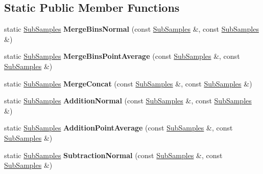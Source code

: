 \subsection*{Static Public Member Functions}
\begin{DoxyCompactItemize}
\item 
\mbox{\label{classQn_1_1SubSamples_a8800a686a91438faf17d5fd3bfb04561}} 
static \mbox{\hyperlink{classQn_1_1SubSamples}{Sub\+Samples}} {\bfseries Merge\+Bins\+Normal} (const \mbox{\hyperlink{classQn_1_1SubSamples}{Sub\+Samples}} \&, const \mbox{\hyperlink{classQn_1_1SubSamples}{Sub\+Samples}} \&)
\item 
\mbox{\label{classQn_1_1SubSamples_a6c499fab1964e330b2531aed834306ec}} 
static \mbox{\hyperlink{classQn_1_1SubSamples}{Sub\+Samples}} {\bfseries Merge\+Bins\+Point\+Average} (const \mbox{\hyperlink{classQn_1_1SubSamples}{Sub\+Samples}} \&, const \mbox{\hyperlink{classQn_1_1SubSamples}{Sub\+Samples}} \&)
\item 
\mbox{\label{classQn_1_1SubSamples_a2df436ba16263977525d033f22ad37d0}} 
static \mbox{\hyperlink{classQn_1_1SubSamples}{Sub\+Samples}} {\bfseries Merge\+Concat} (const \mbox{\hyperlink{classQn_1_1SubSamples}{Sub\+Samples}} \&, const \mbox{\hyperlink{classQn_1_1SubSamples}{Sub\+Samples}} \&)
\item 
\mbox{\label{classQn_1_1SubSamples_aac360780d31b557593844e0f78fdfedd}} 
static \mbox{\hyperlink{classQn_1_1SubSamples}{Sub\+Samples}} {\bfseries Addition\+Normal} (const \mbox{\hyperlink{classQn_1_1SubSamples}{Sub\+Samples}} \&, const \mbox{\hyperlink{classQn_1_1SubSamples}{Sub\+Samples}} \&)
\item 
\mbox{\label{classQn_1_1SubSamples_a99ce4fef8c5db53de7f8e0a06e0fa32f}} 
static \mbox{\hyperlink{classQn_1_1SubSamples}{Sub\+Samples}} {\bfseries Addition\+Point\+Average} (const \mbox{\hyperlink{classQn_1_1SubSamples}{Sub\+Samples}} \&, const \mbox{\hyperlink{classQn_1_1SubSamples}{Sub\+Samples}} \&)
\item 
\mbox{\label{classQn_1_1SubSamples_a022b745c37c37d1a177af2ecd3937032}} 
static \mbox{\hyperlink{classQn_1_1SubSamples}{Sub\+Samples}} {\bfseries Subtraction\+Normal} (const \mbox{\hyperlink{classQn_1_1SubSamples}{Sub\+Samples}} \&, const \mbox{\hyperlink{classQn_1_1SubSamples}{Sub\+Samples}} \&)

\end{DoxyCompactItemize}
